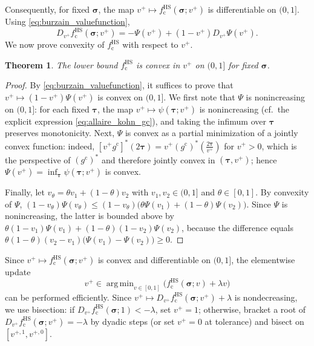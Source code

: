 \documentclass[preprint,3p]{elsarticle}
\newcommand{\tenss}[1]{\bm{\mathbf{#1}}}            %
\newcommand{\stress}{\tenss{\sigma}}                %
\DeclareMathOperator*{\argmin}{arg\,min}
\newtheorem{theorem}{Theorem}[section]
\begin{document}
Consequently, for fixed $\stress$, the map $v^+\mapsto f_{\mathrm{c}}^{\mathrm{HS}}(\stress;v^+)$ is differentiable on $(0,1]$. Using \eqref{eq:burzain_valuefunction},
%
\begin{equation}
    D_{v^+}f_{\mathrm{c}}^{\mathrm{HS}}(\stress;v^+)=-\Psi(v^+)+(1-v^+)D_{v^+}\Psi(v^+).
\end{equation}
%
We now prove convexity of $f_{\mathrm{c}}^{\mathrm{HS}}$ with respect to $v^+$.
%
\begin{theorem}
    The lower bound $f_{\mathrm{c}}^{\mathrm{HS}}$ is convex in $v^+$ on $(0,1]$ for fixed $\stress$.
\end{theorem}
\begin{proof}
    By \eqref{eq:burzain_valuefunction}, it suffices to prove that $v^+\mapsto (1-v^+)\Psi(v^+)$ is convex on $(0,1]$. We first note that $\Psi$ is nonincreasing on $(0,1]$: for each fixed $\tenss{\tau}$, the map $v^+\mapsto \psi(\tenss{\tau};v^+)$ is nonincreasing (cf.\ the explicit expression \eqref{eq:allaire_kohn_gc}), and taking the infimum over $\tenss{\tau}$ preserves monotonicity. Next, $\Psi$ is convex as a partial minimization of a jointly convex function: indeed,
    $[v^+g^\mathrm{c}]^*(2\tenss{\tau})=v^+(g^\mathrm{c})^*\!\left(\frac{2\tenss{\tau}}{v^+}\right)$ for $v^+>0$, which is the perspective of $(g^\mathrm{c})^*$ and therefore jointly convex in $(\tenss{\tau},v^+)$; hence $\Psi(v^+)=\inf_{\tenss{\tau}}\psi(\tenss{\tau};v^+)$ is convex.

    Finally, let $v_\theta=\theta v_1+(1-\theta)v_2$ with $v_1,v_2\in(0,1]$ and $\theta\in[0,1]$. By convexity of $\Psi$, $(1-v_\theta)\Psi(v_\theta)\leq (1-v_\theta)\bigl(\theta\Psi(v_1)+(1-\theta)\Psi(v_2)\bigr)$. Since $\Psi$ is nonincreasing, the latter is bounded above by $\theta(1-v_1)\Psi(v_1)+(1-\theta)(1-v_2)\Psi(v_2)$, because the difference equals $\theta(1-\theta)(v_2-v_1)\bigl(\Psi(v_1)-\Psi(v_2)\bigr)\geq 0$.
\end{proof}
%
Since $v^+\mapsto f_{\mathrm{c}}^{\mathrm{HS}}(\stress;v^+)$ is convex and differentiable on $(0,1]$, the elementwise update
%
\begin{equation}
v^+\in\argmin_{v\in[0,1]}\bigl(f_{\mathrm{c}}^{\mathrm{HS}}(\stress;v)+\lambda v\bigr)
\end{equation}
%
can be performed efficiently. Since $v^+\mapsto D_{v^+} f_{\mathrm{c}}^{\mathrm{HS}}(\stress;v^+)+\lambda$ is nondecreasing, we use bisection: if $D_{v^+}f_{\mathrm{c}}^{\mathrm{HS}}(\stress;1)<-\lambda$, set $v^+=1$; otherwise, bracket a root of $D_{v^+} f_{\mathrm{c}}^{\mathrm{HS}}(\stress;v^+)=-\lambda$ by dyadic steps (or set $v^+=0$ at tolerance) and bisect on $[v^{+,1},v^{+,0}]$.
\end{document}
